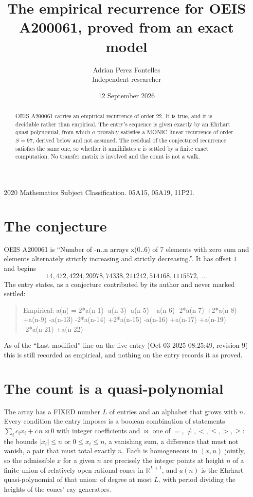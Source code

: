 \documentclass[11pt,a4paper]{article}
\title{The empirical recurrence for OEIS A200061, proved from an exact model}
\author{Adrian Perez Fontelles\\ \small Independent researcher}
\date{12 September 2026}
\theoremstyle{plain}
\theoremstyle{definition}
\begin{document}
\maketitle

\begin{abstract}
OEIS A200061 carries an empirical recurrence of order $22$. It is true, and it is
decidable rather than empirical. The entry's sequence is given exactly by an Ehrhart quasi-polynomial, from
which $a$ provably satisfies a MONIC linear recurrence of order $S=97$, derived below and not
assumed. The residual of the conjectured recurrence satisfies the same one, so whether it
annihilates $a$ is settled by a finite exact computation. No transfer matrix is involved and
the count is not a walk.
\end{abstract}

\noindent\small 2020 Mathematics Subject Classification. 05A15, 05A19, 11P21.\normalsize

\section{The conjecture}

OEIS A200061 is ``Number of -n..n arrays x(0..6) of 7 elements with zero sum and elements alternately strictly increasing and strictly decreasing.''. It has offset $1$ and begins
\[
14, 472, 4224, 20978, 74338, 211242, 514168, 1115572,\ \dots
\]
The entry states, as a conjecture contributed by its author and never marked settled:
\begin{quote}
Empirical: a(n) = 2*a(n-1) -a(n-3) -a(n-5) +a(n-6) -2*a(n-7) +2*a(n-8) +a(n-9) -a(n-13) -2*a(n-14) +2*a(n-15) -a(n-16) +a(n-17) +a(n-19) -2*a(n-21) +a(n-22)
\end{quote}
As of the ``Last modified'' line on the live entry (Oct 03 2025 08:25:49, revision 9)
this is still recorded as empirical, and nothing on the entry records it as proved.

\section{The count is a quasi-polynomial}

The array has a FIXED number $L$ of entries and an alphabet that grows with $n$. Every
condition the entry imposes is a boolean combination of statements
$\sum_i c_ix_i + c\,n \bowtie 0$ with integer coefficients and $\bowtie$ one of
$=,\ne,<,\le,>,\ge$: the bounds $|x_i|\le n$ or $0\le x_i\le n$, a vanishing sum, a difference
that must not vanish, a pair that must total exactly $n$. Each is homogeneous in $(x,n)$
jointly, so the admissible $x$ for a given $n$ are precisely the integer points at height $n$
of a finite union of relatively open rational cones in $\mathbb{R}^{L+1}$, and $a(n)$ is
the Ehrhart quasi-polynomial of that union: of degree at most $L$, with period dividing the
heights of the cones' ray generators.
\end{document}
